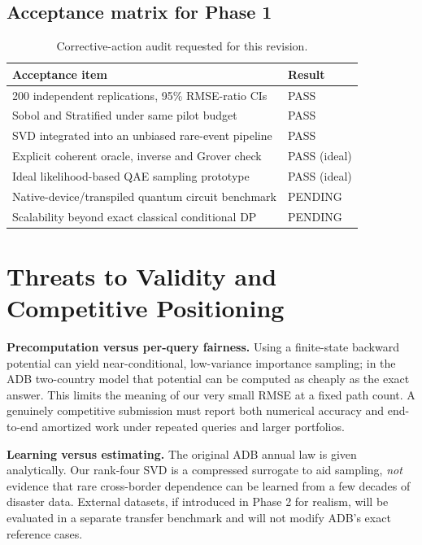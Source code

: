 \documentclass[10pt,conference]{IEEEtran}
\begin{document}
\subsection{Acceptance matrix for Phase 1}
\begin{table}[t]
\centering
\caption{Corrective-action audit requested for this revision.}
\label{tab:accept}
\scriptsize
\setlength{\tabcolsep}{3.2pt}
\begin{tabular}{@{}p{}l@{}}
\toprule
Acceptance item & Result \\
\midrule
200 independent replications, 95\% RMSE-ratio CIs & PASS \\
Sobol and Stratified under same pilot budget & PASS \\
SVD integrated into an unbiased rare-event pipeline & PASS \\
Explicit coherent oracle, inverse and Grover check & PASS (ideal) \\
Ideal likelihood-based QAE sampling prototype & PASS (ideal) \\
Native-device/transpiled quantum circuit benchmark & PENDING \\
Scalability beyond exact classical conditional DP & PENDING \\
\bottomrule
\end{tabular}
\end{table}

\section{Threats to Validity and Competitive Positioning}
\textbf{Precomputation versus per-query fairness.} Using a finite-state backward potential can yield near-conditional, low-variance importance sampling; in the ADB two-country model that potential can be computed as cheaply as the exact answer. This limits the meaning of our very small RMSE at a fixed path count. A genuinely competitive submission must report both numerical accuracy and end-to-end amortized work under repeated queries and larger portfolios.

\textbf{Learning versus estimating.} The original ADB annual law is given analytically. Our rank-four SVD is a compressed surrogate to aid sampling, \emph{not} evidence that rare cross-border dependence can be learned from a few decades of disaster data. External datasets, if introduced in Phase 2 for realism, will be evaluated in a separate transfer benchmark and will not modify ADB's exact reference cases.
\end{document}

